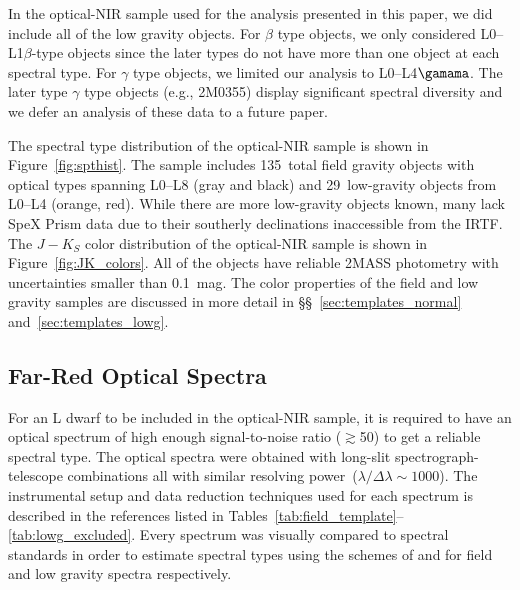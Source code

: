 \documentclass[12pt,preprint]{aastex}
\newcommand{\optNormal}{135}
\newcommand{\optLowG}{29}
\begin{document}
In the optical-NIR sample used for the analysis presented in this paper, we did include all of the low gravity objects.
For $\beta$ type objects, we only considered L0--L1$\beta$-type objects since the later types do not have more than one object at each spectral type.
For $\gamma$ type objects, we limited our analysis to L0--L4$\gamama$. 
The later type $\gamma$ type objects (e.g., 2M0355) display significant spectral diversity and we defer an analysis of these data to a future paper.

The spectral type distribution of the optical-NIR sample is shown in Figure~\ref{fig:spthist}. 
The sample includes \optNormal~total field gravity objects with optical types spanning L0--L8 (gray and black)
and \optLowG~low-gravity objects from L0--L4 (orange, red). 
While there are more low-gravity objects known, many lack SpeX Prism data due to their southerly declinations inaccessible from the IRTF.
The $J-K_S$ color distribution of the optical-NIR sample is shown in Figure~\ref{fig:JK_colors}. 
All of the objects have reliable 2MASS photometry with uncertainties smaller than 0.1~mag. 
The color properties of the field and low gravity samples are discussed in more detail in \S\S~\ref{sec:templates_normal} and~\ref{sec:templates_lowg}.

\subsection{Far-Red Optical Spectra}

For an L dwarf to be included in the optical-NIR sample, it is required to have an optical spectrum of high enough signal-to-noise ratio ($\gtrsim$50) to get a reliable spectral type.
The optical spectra were obtained with long-slit spectrograph-telescope combinations all with similar resolving power~($\lambda/\Delta\lambda\sim1000$). 
The instrumental setup and data reduction techniques used for each spectrum is described in the references listed in Tables~\ref{tab:field_template}--\ref{tab:lowg_excluded}.
Every spectrum was visually compared to spectral standards in order to estimate spectral types using the schemes of \citet{K99} and \cite{Cruz09_lowg} for field and low gravity spectra respectively.  

\end{document}
